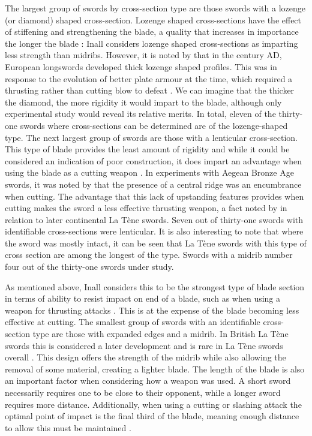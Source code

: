 	

The largest group of swords by cross-section type are those swords with a lozenge (or diamond) shaped cross-section. 
Lozenge shaped cross-sections have the effect of stiffening and strengthening the blade, a quality that increases in importance the longer the blade \parencite[106]{Inall2009}:
Inall considers lozenge shaped cross-sections as imparting less strength than midribs. 
However, it is noted by \textcite{Oakeshott1960} that in the  century AD, European longswords developed thick lozenge shaped profiles. 
This was in response to the evolution of better plate armour at the time, which required a thrusting rather than cutting blow to defeat \parencite[301]{Oakeshott1960}. 
We can imagine that the thicker the diamond, the more rigidity it would impart to the blade, although only experimental study would reveal its relative merits. 
In total, eleven of the thirty-one swords where cross-sections can be determined are of the lozenge-shaped type.
The next largest group of swords are those with a lenticular cross-section. 
This type of blade provides the least amount of rigidity and while it could be considered an indication of poor construction, 
it does impart an advantage when using the blade as a cutting weapon \parencite[106]{Inall2009}. 
In experiments with Aegean Bronze Age swords, it was noted by \textcite[124]{Molloy2008} that the presence of a central ridge was an encumbrance when cutting. 
The advantage that this lack of upstanding features provides when cutting makes the sword a less effective thrusting weapon, a fact noted by \textcite[54\psqq]{Oakeshott1960} in relation to later continental La Tène swords. 
Seven out of thirty-one swords with identifiable cross-sections were lenticular. It is also interesting to note that where the sword was mostly intact, it can be seen that La Tène swords with this type of cross section are among the longest of the type.
Swords with a midrib number four out of the thirty-one swords under study. 

As mentioned above, Inall considers this to be the strongest type of blade section in terms of ability to resist impact on end of a blade, 
such as when using a weapon for thrusting attacks \parencite[106]{Inall2009}. 
This is at the expense of the blade becoming less effective at cutting.
The smallest group of swords with an identifiable cross-section type are those with expanded edges and a midrib. 
In British La Tène swords this is considered a later development \parencite[9]{Stead2006} and is rare in La Tène swords overall \parencite[61]{Pleiner1993}. 
This design offers the strength of the midrib while also allowing the removal of some material, creating a lighter blade.
The length of the blade is also an important factor when considering how a weapon was used. 
A short sword necessarily requires one to be close to their opponent, while a longer sword requires more distance. 
Additionally, when using a cutting or slashing attack the optimal point of impact is the final third of the blade, 
meaning enough distance to allow this must be maintained \parencite[104\psq]{Inall2009}. 

